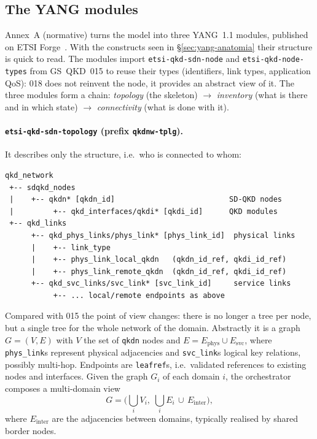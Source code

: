 \subsection{The YANG modules}
\label{sec:yang018}

Annex~A (normative) turns the model into three YANG~1.1 modules, published
on ETSI Forge~\cite{qkd018yang}. With the constructs seen in
§\ref{sec:yang-anatomia} their structure is quick to read. The modules
import \texttt{etsi-qkd-sdn-node} and \texttt{etsi-qkd-node-types} from
GS~QKD~015 to reuse their types (identifiers, link types, application QoS):
018 does not reinvent the node, it provides an abstract view of it. The
three modules form a chain: \emph{topology} (the skeleton) $\to$
\emph{inventory} (what is there and in which state) $\to$
\emph{connectivity} (what is done with it).

\paragraph{\texttt{etsi-qkd-sdn-topology} (prefix \texttt{qkdnw-tplg}).}
It describes only the structure, i.e.\ who is connected to whom:
\begin{lstlisting}
qkd_network
 +-- sdqkd_nodes
 |    +-- qkdn* [qkdn_id]                          SD-QKD nodes
 |         +-- qkd_interfaces/qkdi* [qkdi_id]      QKD modules
 +-- qkd_links
      +-- qkd_phys_links/phys_link* [phys_link_id]  physical links
      |    +-- link_type
      |    +-- phys_link_local_qkdn   (qkdn_id_ref, qkdi_id_ref)
      |    +-- phys_link_remote_qkdn  (qkdn_id_ref, qkdi_id_ref)
      +-- qkd_svc_links/svc_link* [svc_link_id]     service links
           +-- ... local/remote endpoints as above
\end{lstlisting}
Compared with 015 the point of view changes: there is no longer a tree per
node, but a single tree for the whole network of the domain. Abstractly it
is a graph $G=(V,E)$ with $V$ the set of \texttt{qkdn} nodes and
$E = E_{\text{phys}}\cup E_{\text{svc}}$, where \texttt{phys\_link}s
represent physical adjacencies and \texttt{svc\_link}s logical key
relations, possibly multi-hop. Endpoints are \texttt{leafref}s, i.e.\
validated references to existing nodes and interfaces. Given the graph
$G_i$ of each domain $i$, the orchestrator composes a multi-domain view
\begin{equation}
  G = \Big(\bigcup_i V_i,\; \bigcup_i E_i \,\cup\, E_{\text{inter}}\Big),
\end{equation}
where $E_{\text{inter}}$ are the adjacencies between domains, typically
realised by shared border nodes.


